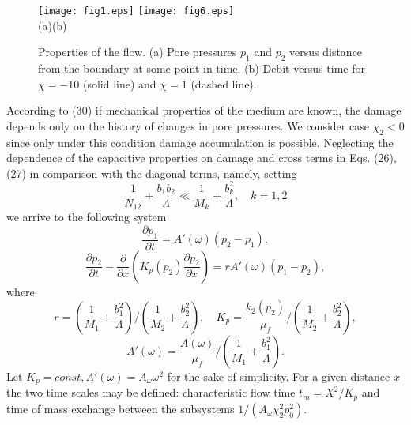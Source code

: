 \documentclass[article,authoryear,jpm]{beg_39}             %
\begin{document}
\begin{figure}[!b]
	\centering
\texttt{[image: fig1.eps]} %
\texttt{[image: fig6.eps]} \\
  (a)\hspace*{220pt}(b)
\caption{ Properties of the flow. (a) Pore pressures $p_1$ and $p_2$ versus distance from the boundary at some point in time. (b) Debit versus time for $\chi=-10$ (solid line) and $\chi=1$ (dashed line).}
\label{fig2}
\end{figure}

According to (30) if mechanical properties of the medium are known, the damage depends only on the history of changes in pore pressures. We consider case ${{\chi}_{2}}< 0$ since only under this condition damage accumulation is possible.
Neglecting the dependence of the capacitive properties on damage and cross terms in Eqs. (26), (27) in comparison with the diagonal terms, namely, setting
\begin{equation}
\frac{1}{{{N}_{12}}}+\frac{{{b}_{1}}{{b}_{2}}}{\Lambda}\ll \frac{1}{{{M}_{k}}}+\frac{b_{k}^{2}}{\Lambda},\quad k=1,2
\end{equation}
we arrive to the following system
\begin{equation}
\frac{\partial {{p}_{1}}}{\partial t}=A'(\omega )({{p}_{2}}-{{p}_{1}}),
\end{equation}
\begin{equation}
\frac{\partial {{p}_{2}}}{\partial t}-\frac{\partial }{\partial x}\left( {{K}_{p}}({{p}_{2}})\frac{\partial {{p}_{2}}}{\partial x} \right)=rA'(\omega )({{p}_{1}}-{{p}_{2}}),
\end{equation}
where
\begin{equation}
r=\left( \frac{1}{{{M}_{1}}}+\frac{b_{1}^{2}}{\Lambda} \right)/\left( \frac{1}{{{M}_{2}}}+\frac{b_{2}^{2}}{\Lambda} \right),\quad {{K}_{p}}=\frac{{{k}_{2}}({{p}_{2}})}{{{\mu }_{f}}}/\left( \frac{1}{{{M}_{2}}}+\frac{b_{2}^{2}}{\Lambda} \right),
\end{equation}
\begin{equation}
A'(\omega )=\frac{A(\omega )}{\mu_f}/ \left( \frac{1}{{{M}_{1}}}+\frac{b_{1}^{2}}{\Lambda}\right).
\end{equation}
Let ${{K}_{p}}=const, A'(\omega )={{A}_{\omega }}{{\omega }^{2}}$ for the sake of simplicity.
For a given distance $x$ the two time scales may be defined: characteristic flow time ${{t}_{m}}={{X}^{2}}/{{K}_{p}}$ and time of mass exchange between the subsystems $1/({{A}_{\omega }}\chi_{2}^{2}p_{0}^{2})$.
\end{document}
